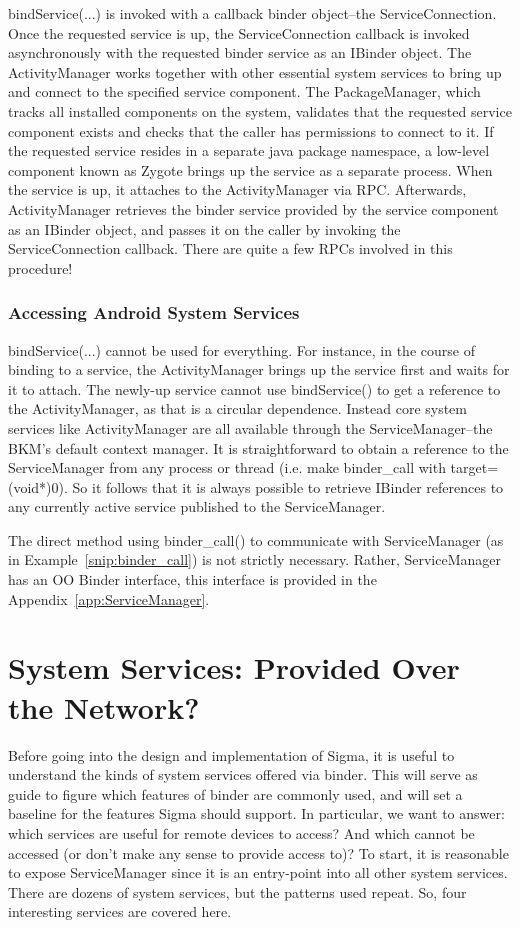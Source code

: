 \documentclass[prodmode]{acmlarge}
\begin{document}
bindService(...) is invoked with a callback binder object--the ServiceConnection. Once the requested service is up, the ServiceConnection callback is invoked asynchronously with the requested binder service as an IBinder object. The ActivityManager works together with other essential system services to bring up and connect to the specified service component. The PackageManager, which tracks all installed components on the system, validates that the requested service component exists and checks that the caller has permissions to connect to it. If the requested service resides in a separate java package namespace, a low-level component known as Zygote brings up the service as a separate process. When the service is up, it attaches to the ActivityManager via RPC. Afterwards, ActivityManager retrieves the binder service provided by the service component as an IBinder object, and passes it on the caller by invoking the ServiceConnection callback. There are quite a few RPCs involved in this procedure!

\subsubsection{Accessing Android System Services}
bindService(...) cannot be used for everything. For instance, in the course of binding to a service, the ActivityManager brings up the service first and waits for it to attach. The newly-up service cannot use bindService() to get a reference to the ActivityManager, as that is a circular dependence. Instead core system services like ActivityManager are all available through the ServiceManager--the BKM's default context manager. It is straightforward to obtain a reference to the ServiceManager from any process or thread (i.e. make binder\_call with target=(void*)0). So it follows that it is always possible to retrieve IBinder references to any currently active service published to the ServiceManager.

The direct method using binder\_call() to communicate with ServiceManager (as in Example~\ref{snip:binder_call}) is not strictly necessary. Rather, ServiceManager has an OO Binder interface, this interface is provided in the Appendix~\ref{app:ServiceManager}. 

\section{System Services: Provided Over the Network?}
\label{sec:SystemServices}
Before going into the design and implementation of Sigma, it is useful to understand the kinds of system services offered via binder. This will serve as guide to figure which features of binder are commonly used, and will set a baseline for the features Sigma should support. In particular, we want to answer: which services are useful for remote devices to access? And which cannot be accessed (or don't make any sense to provide access to)?  To start, it is reasonable to expose ServiceManager since it is an entry-point into all other system services. There are dozens of system services, but the patterns used repeat. So, four interesting services are covered here.
\end{document}
